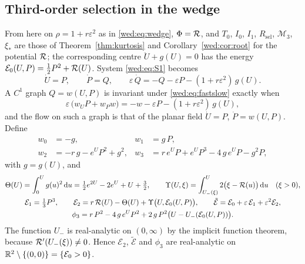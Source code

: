 \subsection{Third-order selection in the wedge}\label{wed:sec:normalform}
From here on $\rho=1+r\varepsilon^2$ as in \eqref{wed:eq:wedge}, $\Phi=\mathcal R$, and $T_0$, $I_0$, $I_1$, $R_{\mathrm{sel}}$, $\mathcal M_3$, $\xi_*$ are those of Theorem~\ref{thm:kurtosis} and Corollary~\ref{wed:cor:root} for the potential $\mathcal R$; the corresponding centre $\ddot U+g(U)=0$ has the energy $\mathcal E_0(U,P)=\tfrac12P^2+\mathcal R(U)$. System \eqref{wed:eq:S1} becomes
\begin{equation}\label{wed:eq:fastslow}
\dot U=P,\qquad \dot P=Q,\qquad \varepsilon\,\dot Q=-Q-\varepsilon P-(1+r\varepsilon^2)\,g(U).
\end{equation}
A $C^1$ graph $Q=w(U,P)$ is invariant under \eqref{wed:eq:fastslow} exactly when
\begin{equation}\label{wed:eq:invariance}
\varepsilon\,\bigl(w_UP+w_Pw\bigr)=-w-\varepsilon P-(1+r\varepsilon^2)\,g(U),
\end{equation}
and the flow on such a graph is that of the planar field $\dot U=P$, $\dot P=w(U,P)$. Define
\begin{equation}\label{wed:eq:wcoefficients}
\begin{aligned}
w_0&=-g,& w_1&=g\,P,\\
w_2&=-r\,g-e^UP^2+g^2,& w_3&=r\,e^UP+e^UP^3-4\,g\,e^UP-g^2P,
\end{aligned}
\end{equation}
with $g=g(U)$, and
\begin{equation}\label{wed:eq:auxiliary}
\begin{gathered}
\Theta(U)=\int_0^Ug(u)^2\,\mathrm du=\tfrac12e^{2U}-2e^U+U+\tfrac32,\qquad
\Upsilon(U,\xi)=\int_{U_-(\xi)}^{U}2\bigl(\xi-\mathcal R(u)\bigr)\,\mathrm du\quad(\xi>0),\\
\mathcal E_1=\tfrac13P^3,\qquad
\mathcal E_2=r\,\mathcal R(U)-\Theta(U)+\Upsilon\bigl(U,\mathcal E_0(U,P)\bigr),\qquad
\tilde{\mathcal E}=\mathcal E_0+\varepsilon\,\mathcal E_1+\varepsilon^2\mathcal E_2,\\
\phi_3=r\,P^2-4\,g\,e^UP^2+2\,g\,P^2\bigl(U-U_-(\mathcal E_0(U,P))\bigr).
\end{gathered}
\end{equation}
The function $U_-$ is real-analytic on $(0,\infty)$ by the implicit function theorem, because $\mathcal R'(U_-(\xi))\neq0$. Hence $\mathcal E_2$, $\tilde{\mathcal E}$ and $\phi_3$ are real-analytic on $\mathbb R^2\setminus\{(0,0)\}=\{\mathcal E_0>0\}$.

